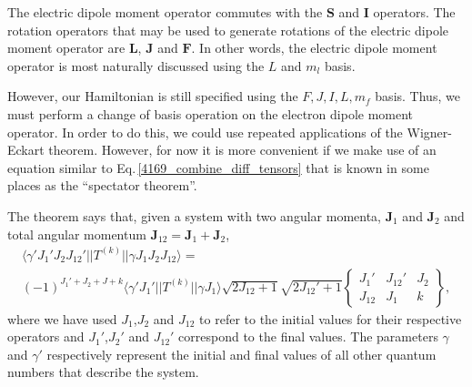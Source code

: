 The electric dipole moment operator commutes with the $\mathbf{S}$ and $\mathbf{I}$ operators. The rotation operators that may be used to generate rotations of the electric dipole moment operator are $\mathbf{L}$, $\mathbf{J}$ and $\mathbf{F}$\cite{DeMille_presentation}. In other words, the electric dipole moment operator is most naturally discussed using the $L$ and $m_l$ basis. 

However,  our Hamiltonian is still specified using the $F, J, I, L, m_f$ basis. Thus,  we must perform a change of basis operation on the electron dipole moment operator. In order to do this,  we could use repeated applications of the Wigner-Eckart theorem.  
However, for now it is more convenient if we make use of an equation similar to Eq.\,\ref{4169_combine_diff_tensors} that is known in some places as the ``spectator theorem''\cite{DeMille_presentation}. %

The theorem says that, given a system with two angular momenta, $\mathbf{J}_1$ and $\mathbf{J}_2$ and total angular momentum $\mathbf{J}_{12}=\mathbf{J}_1+\mathbf{J}_2$,
\begin{multline}\label{spectatorTheorem}
\langle\gamma' J_1'J_2J_{12}'||T^{(k)}||\gamma J_1 J_2 J_{12}\rangle=
\\(-1)^{J_1'+J_2+J+k}\langle\gamma'J_1'||T^{(k)}||\gamma J_1\rangle
\sqrt{2J_{12}+1}\sqrt{2J_{12}'+1}
\begin{Bmatrix}
J_1' & J_{12}' & J_2 \\
J_{12} & J_1 & k
\end{Bmatrix},
\end{multline}
where we have used $J_{1}$,$J_{2}$ and $J_{12}$ to refer to the initial values for their respective operators and $J_{1}'$,$J_{2}'$ and $J_{12}'$ correspond to the final values. The parameters $\gamma$ and $\gamma'$ respectively represent the initial and final values of all other quantum numbers that describe the system.

